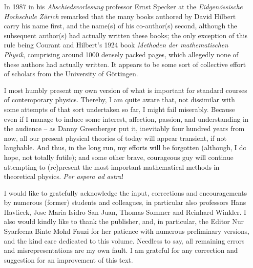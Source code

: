 {In 1987 in his} {\it Abschiedsvorlesung} professor Ernst Specker
at the {\it Eidgen\"ossische Hochschule Z\"urich}
remarked that
the many books authored by David Hilbert carry his name first,
and the name(s) of his co-author(s) second,
although the subsequent author(s) had actually written these books;
the only exception of this rule being Courant and Hilbert's 1924 book
{\em Methoden der mathematischen Physik},
comprising around 1000 densely packed pages,
which allegedly none of these authors had actually written.
It appears to be some sort of collective effort of scholars from the University of G\"ottingen.


I most humbly present my own version of what is important for standard courses of contemporary physics.
Thereby, I am quite aware that, not dissimilar with some attempts of that sort undertaken so far, I might fail miserably.
Because even if I manage to induce some interest, affection, passion, and understanding in the audience --
as Danny Greenberger put it,
inevitably
four hundred years from now, all our present physical theories of today will appear transient\cite[-40mm]{lakatosch}, if not laughable.
And thus, in the long run, my efforts will be forgotten (although, I do hope, not totally futile); and some other brave, courageous guy
will continue attempting to (re)present the most important mathematical methods in theoretical physics.
{\it Per aspera ad astra}!


\newpage


I would like to gratefully acknowledge the input, corrections and encouragements by numerous (former) students and colleagues,
in particular also professors Hans Havlicek, Jose Maria Isidro San Juan, Thomas Sommer and Reinhard Winkler.
I also would kindly like to thank the publisher, and, in particular, the Editor Nur Syarfeena Binte Mohd Fauzi
for her patience with numerous preliminary versions, and the kind care dedicated to this volume.
Needless to say, all remaining errors and misrepresentations
are my own fault. I am grateful for any correction and suggestion for an improvement of this text.

\begin{center}
{\color{lightgray}   \Huge
\aldine
}
\end{center}

